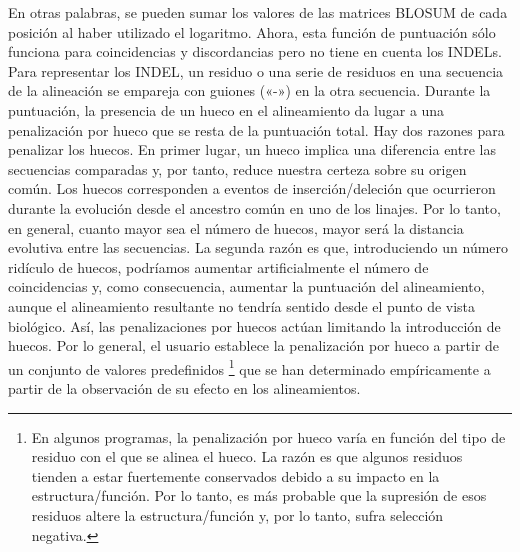En otras palabras, se pueden sumar los valores de las matrices BLOSUM de cada posición al haber utilizado el logaritmo. Ahora, esta función de puntuación sólo funciona para coincidencias y discordancias pero no tiene en cuenta los INDELs. Para representar los INDEL, un residuo o una serie de residuos en una secuencia de la alineación se empareja con guiones («-») en la otra secuencia. Durante la puntuación, la presencia de un hueco en el alineamiento da lugar a una penalización por hueco que se resta de la puntuación total. Hay dos razones para penalizar los huecos. En primer lugar, un hueco implica una diferencia entre las secuencias comparadas y, por tanto, reduce nuestra certeza sobre su origen común. Los huecos corresponden a eventos de inserción/deleción que ocurrieron durante la evolución desde el ancestro común en uno de los linajes. Por lo tanto, en general, cuanto mayor sea el número de huecos, mayor será la distancia evolutiva entre las secuencias. La segunda razón es que, introduciendo un número ridículo de huecos, podríamos aumentar artificialmente el número de coincidencias y, como consecuencia, aumentar la puntuación del alineamiento, aunque el alineamiento resultante no tendría sentido desde el punto de vista biológico. Así, las penalizaciones por huecos actúan limitando la introducción de huecos. Por lo general, el usuario establece la penalización por hueco a partir de un conjunto de valores predefinidos \footnote{En algunos programas, la penalización por hueco varía en función del tipo de residuo con el que se alinea el hueco. La razón es que algunos residuos tienden a estar fuertemente conservados debido a su impacto en la estructura/función. Por lo tanto, es más probable que la supresión de esos residuos altere la estructura/función y, por lo tanto, sufra selección negativa.} que se han determinado empíricamente a partir de la observación de su efecto en los alineamientos.


